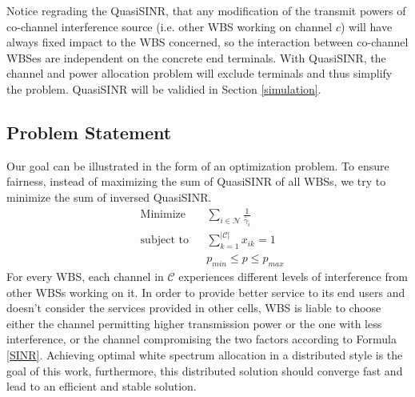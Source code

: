 Notice regrading the QuasiSINR, that any modification of the transmit powers of co-channel interference source (i.e. other WBS working on channel $c$) will have always fixed impact to the WBS concerned, so the interaction between co-channel WBSes are independent on the concrete end terminals. With QuasiSINR, the channel and power allocation problem will exclude terminals and thus simplify the problem. QuasiSINR will be validied in Section \ref{simulation}. 



\subsection{Problem Statement}
Our goal can be illustrated in the form of an optimization problem.
To ensure fairness, instead of maximizing the sum of QuasiSINR of all WBSs, we try to minimize the sum of inversed QuasiSINR. 
	\begin{equation}
\label{problem}
			\begin{aligned}
			& {\text{Minimize}}
			& & \sum_{i\in \mathcal{N}}\frac{1}{\tilde{\gamma_{i}}} \\
			& \text{subject to}
			& & \sum_{k=1}^{|\mathcal{C}|}x_{ik}=1 \\
			& & & p_{min} \leq p \leq p_{max}
			\end{aligned}
		\end{equation}
For every WBS, each channel in $\mathcal{C}$ experiences different levels of interference from other WBSs working on it.
In order to provide better service to its end users and doesn't consider the services provided in other cells, WBS is liable to choose either the channel permitting higher transmission power or the one with less interference, or the channel compromising the two factors according to Formula \ref{SINR}.
 Achieving optimal white spectrum allocation in a distributed style is the goal of this work, furthermore, this distributed solution should converge fast and lead to an efficient and stable solution.


